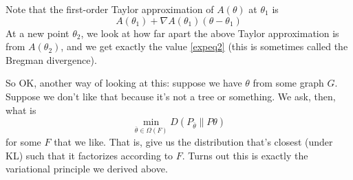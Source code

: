 \documentclass{article}
\newcommand{\M}{\mathcal{M}}
\begin{document}
Note that the first-order Taylor approximation of $A(\theta)$ at $\theta_1$ is
$$
A(\theta_1) + \nabla A(\theta_1)
(\theta - \theta_1)
$$
At a new point $\theta_2$, we look at how far apart the above Taylor approximation is from $A(\theta_2)$, and we get exactly the value \eqref{expeq2} (this is sometimes called the Bregman divergence).

So OK, another way of looking at this: suppose we have $\theta$ from some graph $G$.
Suppose we don't like that because it's not a tree or something.
We ask, then, what is
$$
\min_{\overline\theta\in \Omega(F)} D(P_{\overline\theta} \| P\theta)
$$
for some $F$ that we like.
That is, give us the distribution that's closest (under KL) such that it factorizes according to $F$.
Turns out this is exactly the variational principle we derived above.
%
%
%
%
%
\end{document}
